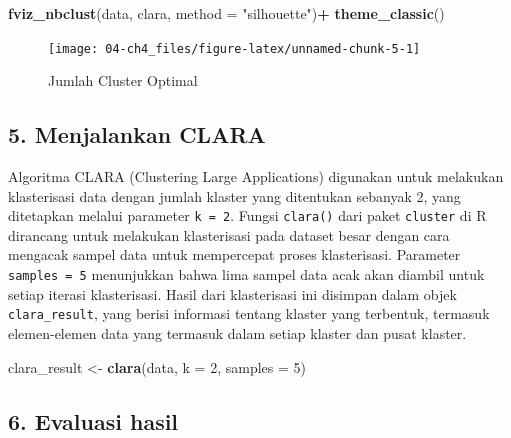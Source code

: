 \documentclass[
  oneside]{book}
\newenvironment{Shaded}{\begin{snugshade}}{\end{snugshade}}
\newcommand{\AttributeTok}[1]{\textcolor[rgb]{0.13,0.29,0.53}{#1}}
\newcommand{\DecValTok}[1]{\textcolor[rgb]{0.00,0.00,0.81}{#1}}
\newcommand{\FunctionTok}[1]{\textcolor[rgb]{0.13,0.29,0.53}{\textbf{#1}}}
\newcommand{\NormalTok}[1]{#1}
\newcommand{\OtherTok}[1]{\textcolor[rgb]{0.56,0.35,0.01}{#1}}
\newcommand{\SpecialCharTok}[1]{\textcolor[rgb]{0.81,0.36,0.00}{\textbf{#1}}}
\newcommand{\StringTok}[1]{\textcolor[rgb]{0.31,0.60,0.02}{#1}}
\begin{document}
\begin{Shaded}
\begin{Highlighting}[]
\FunctionTok{fviz\_nbclust}\NormalTok{(data, clara, }\AttributeTok{method =} \StringTok{"silhouette"}\NormalTok{)}\SpecialCharTok{+}
\FunctionTok{theme\_classic}\NormalTok{()}
\end{Highlighting}
\end{Shaded}

\begin{figure}[h]

{\centering \texttt{[image: 04-ch4\_files/figure-latex/unnamed-chunk-5-1]} 

}

\caption{Jumlah Cluster Optimal}\label{fig:unnamed-chunk-5}
\end{figure}

\subsection*{5. Menjalankan CLARA}\label{menjalankan-clara}

Algoritma CLARA (Clustering Large Applications) digunakan untuk melakukan klasterisasi data dengan jumlah klaster yang ditentukan sebanyak 2, yang ditetapkan melalui parameter \texttt{k\ =\ 2}. Fungsi \texttt{clara()} dari paket \texttt{cluster} di R dirancang untuk melakukan klasterisasi pada dataset besar dengan cara mengacak sampel data untuk mempercepat proses klasterisasi. Parameter \texttt{samples\ =\ 5} menunjukkan bahwa lima sampel data acak akan diambil untuk setiap iterasi klasterisasi. Hasil dari klasterisasi ini disimpan dalam objek \texttt{clara\_result}, yang berisi informasi tentang klaster yang terbentuk, termasuk elemen-elemen data yang termasuk dalam setiap klaster dan pusat klaster.

\begin{Shaded}
\begin{Highlighting}[]
\NormalTok{clara\_result }\OtherTok{\textless{}{-}} \FunctionTok{clara}\NormalTok{(data, }\AttributeTok{k =} \DecValTok{2}\NormalTok{, }\AttributeTok{samples =} \DecValTok{5}\NormalTok{)}
\end{Highlighting}
\end{Shaded}

\subsection*{6. Evaluasi hasil}\label{evaluasi-hasil}
\end{document}
